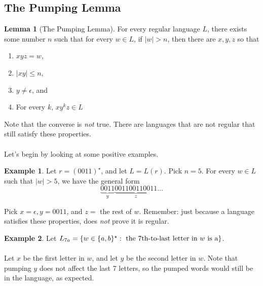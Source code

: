 \documentclass[]{article}
\DeclarePairedDelimiter{\set}{\lbrace}{\rbrace}
\theoremstyle{definition}
\newtheorem*{lemma}{Lemma}
\newtheorem{ex}{Example}[section]
\begin{document}
      \subsection{The Pumping Lemma}
       \begin{lemma}[The Pumping Lemma]
          For every regular language $L$, there exists some number $n$ such that for every $w \in L$, if $|w| > n$, then there are $x, y, z$ so that
          \begin{enumerate}
            \item $xyz = w$,
            \item $|xy| \le n$,
            \item $y \ne \epsilon$, and
            \item For every $k$, $xy^k z \in L$
          \end{enumerate}
        \end{lemma}

        Note that the converse is \emph{not} true. There are languages that are not regular that still satisfy these properties.
        \\ \\
        Let's begin by looking at some positive examples.
        \begin{ex}
          Let $r = (0011)^\star$, and let $L = L(r)$. Pick $n = 5$. For every $w \in L$ such that $|w| > 5$, we have the general form
          $$
            \underbrace{0011}_{y} \underbrace{001100110011}_{z} \ldots
          $$

          Pick $x = \epsilon, y = 0011$, and $z = $ the rest of $w$. Remember: just because a language satisfies these properties, does \emph{not} prove it is regular.
        \end{ex}

        \begin{ex}
          Let $L_{7a} = \set{ w \in \set{a, b}^\star : \text{ the 7th-to-last letter in } w \text{ is a}}$.
          \\ \\
          Let $x$ be the first letter in $w$, and let $y$ be the second letter in $w$. Note that pumping $y$ does not affect the last 7 letters, so the pumped words would still be in the language, as expected.
        \end{ex}
\end{document}
